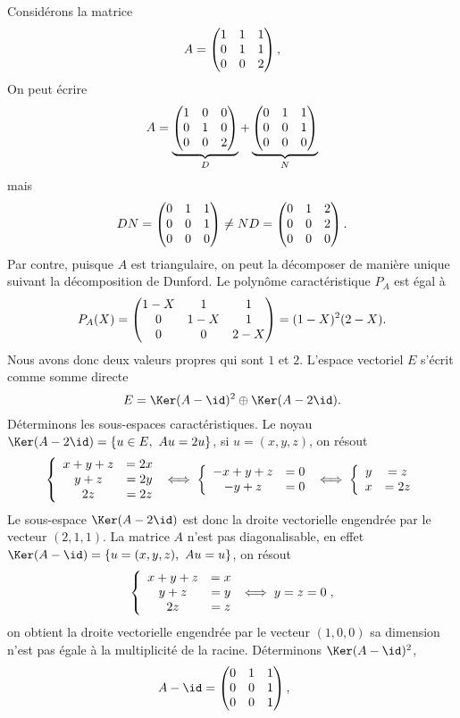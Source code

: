 \documentclass[class=report,crop=false]{standalone}
\begin{document}
\begin{exemple}
Considérons la matrice 
$$A=\left(\begin{matrix}1&1&1\cr 0&1&1\cr 0&0&2\end{matrix}\right),$$
On peut écrire 
$$A=\underbrace{\left(\begin{matrix}1&0&0\cr 0&1&0\cr 0&0&2\end{matrix}\right)}_{D}+\underbrace{\left(\begin{matrix}0&1&1\cr 0&0&1\cr 0&0&0\end{matrix}\right)}_{N}$$
mais $$DN=\left(\begin{matrix}0&1&1\cr 0&0&1\cr 0&0&0\end{matrix}\right)\neq ND=\left(\begin{matrix}0&1&2\cr 0&0&2\cr 0&0&0\end{matrix}\right).$$
Par contre, puisque $A$ est triangulaire, on peut la décomposer de manière unique suivant la décomposition de Dunford. Le polynôme caractéristique $P_A$ est égal à
$$P_A(X)=\left(\begin{matrix}1-X & 1 & 1\cr 0 & 1-X & 1\cr 0 & 0 & 2-X\end{matrix}\right)=(1-X)^2(2-X).$$
Nous avons donc deux valeurs propres qui sont $1$ et $2$. L'espace vectoriel $E$ s'écrit comme somme directe
$$E=\Ker(A-\id)^2\oplus\Ker(A-2\id).$$
Déterminons les sous-espaces caractéristiques. Le noyau $\Ker(A-2\id)=\{u\in E,\ Au=2u\}$, si $u=(x,y,z)$, on résout
$$\left\{\begin{array}{cc}x+y+z&= 2x\cr y+z&=2y\cr 2z&=2z\end{array}\right.\iff\left\{\begin{array}{cc}-x+y+z&= 0\cr -y+z&=0\end{array}\right.
\iff\left\{\begin{array}{cc}y&= z\cr x&=2z\end{array}\right.$$
Le sous-espace $\Ker(A-2\id)$ est donc la droite vectorielle engendrée par le vecteur $(2,1,1)$.
La matrice $A$ n'est pas diagonalisable, en effet $\Ker(A-\id)=\{u=(x,y,z),\ Au=u\}$, on résout
$$\left\{\begin{array}{cc}x+y+z&=x\cr y+z&=y\cr 2z&=z\end{array}\iff y=z=0 \right.,$$
on obtient la droite vectorielle engendrée par le vecteur $(1,0,0)$ sa dimension n'est pas égale à la multiplicité de la racine. Déterminons $\Ker(A-\id)^2$, 
$$A-\id=\left(\begin{matrix}0&1&1\cr0&0&1\cr0&0&1\end{matrix}\right),\ \ \ \ 
$$
\end{exemple}
\end{document}
